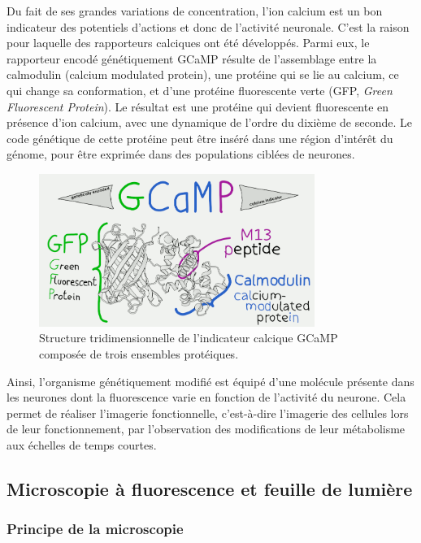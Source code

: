 Du fait de ses grandes variations de concentration, l'ion calcium est un bon indicateur des potentiels d'actions et donc de l'activité neuronale. C'est la raison pour laquelle des rapporteurs calciques ont été développés. Parmi eux, le rapporteur encodé génétiquement GCaMP résulte de l'assemblage entre la calmodulin (calcium modulated protein), une protéine qui se lie au calcium, ce qui change sa conformation, et d'une protéine fluorescente verte (GFP, \emph{Green Fluorescent Protein}). Le résultat est une protéine qui devient fluorescente en présence d'ion calcium, avec une dynamique de l'ordre du dixième de seconde. Le code génétique de cette protéine peut être inséré dans une région d'intérêt du génome, pour être exprimée dans des populations ciblées de neurones.

\begin{figure}
\centering
\includegraphics[width=0.8\textwidth]{./files/GCaMP.png}
\caption{Structure tridimensionnelle de l'indicateur calcique GCaMP composée de trois ensembles protéiques.}
\end{figure}

Ainsi, l'organisme génétiquement modifié est équipé d'une molécule présente dans les neurones dont la fluorescence varie en fonction de l'activité du neurone. Cela permet de réaliser l'imagerie fonctionnelle, c'est-à-dire l'imagerie des cellules lors de leur fonctionnement, par l'observation des modifications de leur métabolisme aux échelles de temps courtes. 

\subsection{Microscopie à fluorescence et feuille de lumière}

\subsubsection{Principe de la microscopie}

